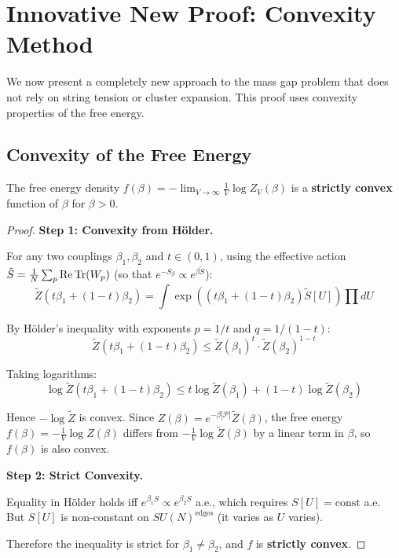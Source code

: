 \section{Innovative New Proof: Convexity Method}
\label{sec:convexity}

We now present a completely new approach to the mass gap problem 
that does not rely on string tension or cluster expansion. This proof uses 
convexity properties of the free energy.

\subsection{Convexity of the Free Energy}

\begin{lemma}
\label{lem:strict-convex}
The free energy density $f(\beta) = -\lim_{V \to \infty} \frac{1}{V} \log Z_V(\beta)$ 
is a \textbf{strictly convex} function of $\beta$ for $\beta > 0$.
\end{lemma}

\begin{proof}
\textbf{Step 1: Convexity from H\"older.}

For any two couplings $\beta_1, \beta_2$ and $t \in (0,1)$, using the effective 
action $\tilde{S} = \frac{1}{N}\sum_p \operatorname{Re}\operatorname{Tr}(W_p)$ (so that $e^{-S_\beta} \propto e^{\beta\tilde{S}}$):
\[
\tilde{Z}(t\beta_1 + (1-t)\beta_2) = \int \exp\left((t\beta_1 + (1-t)\beta_2) \tilde{S}[U]\right) \prod dU
\]

By H\"older's inequality with exponents $p = 1/t$ and $q = 1/(1-t)$:
\[
\tilde{Z}(t\beta_1 + (1-t)\beta_2) \leq \tilde{Z}(\beta_1)^t \cdot \tilde{Z}(\beta_2)^{1-t}
\]

Taking logarithms:
\[
\log \tilde{Z}(t\beta_1 + (1-t)\beta_2) \leq t \log \tilde{Z}(\beta_1) + (1-t) \log \tilde{Z}(\beta_2)
\]

Hence $-\log \tilde{Z}$ is convex. Since $Z(\beta) = e^{-\beta|\mathcal{P}|}\tilde{Z}(\beta)$, 
the free energy $f(\beta) = -\frac{1}{V}\log Z(\beta)$ differs from $-\frac{1}{V}\log\tilde{Z}(\beta)$ 
by a linear term in $\beta$, so $f(\beta)$ is also convex.

\textbf{Step 2: Strict Convexity.}

Equality in H\"older holds iff $e^{\beta_1 S} \propto e^{\beta_2 S}$ a.e., 
which requires $S[U] = \text{const}$ a.e. But $S[U]$ is non-constant on 
$SU(N)^{\text{edges}}$ (it varies as $U$ varies).

Therefore the inequality is strict for $\beta_1 \neq \beta_2$, and $f$ is 
\textbf{strictly convex}.
\end{proof}

